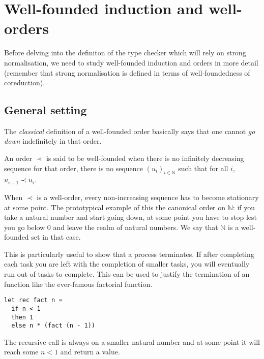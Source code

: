 \chapter{Well-founded induction and well-orders}

Before delving into the definiton of the type checker which will rely on strong
normalisation, we need to study well-founded induction and orders in more
detail (remember that strong normalisation is defined in terms of
well-foundedness of coreduction).

\section{General setting}

The \emph{classical} definition of a well-founded order basically says that one
cannot \emph{go down} indefinitely in that order.

\begin{definition}
  An order \(\prec\) is said to be well-founded when there is no infinitely
  decreasing sequence for that order, \ie there is no sequence
  \((u_i)_{i \in \mathbb{N}}\) such that for all \(i\), \(u_{i+1} \prec u_i\).
\end{definition}

When \(\prec\) is a well-order, every non-increasing sequence has to become
stationary at some point.
The prototypical example of this the canonical order on \(\mathbb{N}\): if you
take a natural number and start going down, at some point you have to stop lest
you go below \(0\) and leave the realm of natural numbers.
We say that \(\mathbb{N}\) is a well-founded set in that case.

This is particularly useful to show that a process terminates. If after
completing each task you are left with the completion of smaller tasks,
you will eventually run out of tasks to complete.
This can be used to justify the termination of an \ocaml function like the
ever-famous factorial function.
\begin{verbatim}
let rec fact n =
  if n < 1
  then 1
  else n * (fact (n - 1))
\end{verbatim}
The recursive call is always on a smaller natural number and at some point it
will reach some \(n < 1\) and return a value.

